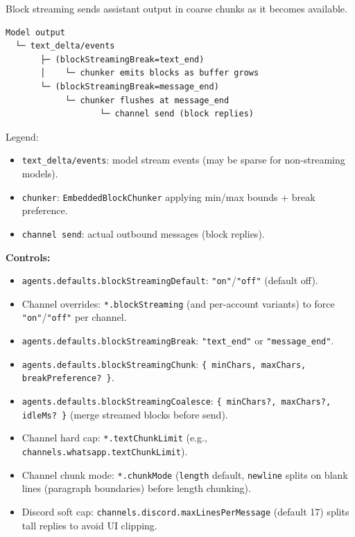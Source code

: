 Block streaming sends assistant output in coarse chunks as it becomes available.

\begin{lstlisting}
Model output
  └─ text_delta/events
       ├─ (blockStreamingBreak=text_end)
       │    └─ chunker emits blocks as buffer grows
       └─ (blockStreamingBreak=message_end)
            └─ chunker flushes at message_end
                   └─ channel send (block replies)
\end{lstlisting}


Legend:

\begin{itemize}
  \item \texttt{text\_delta/events}: model stream events (may be sparse for non-streaming models).
  \item \texttt{chunker}: \texttt{EmbeddedBlockChunker} applying min/max bounds + break preference.
  \item \texttt{channel send}: actual outbound messages (block replies).
\end{itemize}


\textbf{Controls:}

\begin{itemize}
  \item \texttt{agents.defaults.blockStreamingDefault}: \texttt{"on"}/\texttt{"off"} (default off).
  \item Channel overrides: \texttt{*.blockStreaming} (and per-account variants) to force \texttt{"on"}/\texttt{"off"} per channel.
  \item \texttt{agents.defaults.blockStreamingBreak}: \texttt{"text\_end"} or \texttt{"message\_end"}.
  \item \texttt{agents.defaults.blockStreamingChunk}: \texttt{\{ minChars, maxChars, breakPreference? \}}.
  \item \texttt{agents.defaults.blockStreamingCoalesce}: \texttt{\{ minChars?, maxChars?, idleMs? \}} (merge streamed blocks before send).
  \item Channel hard cap: \texttt{*.textChunkLimit} (e.g., \texttt{channels.whatsapp.textChunkLimit}).
  \item Channel chunk mode: \texttt{*.chunkMode} (\texttt{length} default, \texttt{newline} splits on blank lines (paragraph boundaries) before length chunking).
  \item Discord soft cap: \texttt{channels.discord.maxLinesPerMessage} (default 17) splits tall replies to avoid UI clipping.
\end{itemize}


